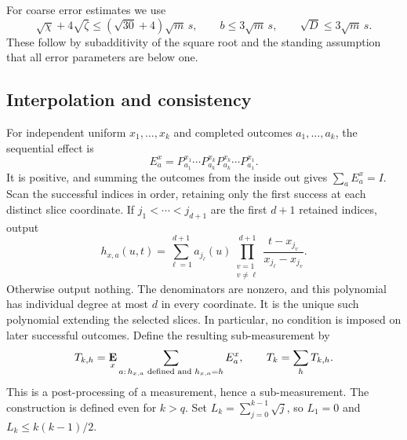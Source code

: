 \documentclass[11pt]{article}
\theoremstyle{definition}
\newcommand{\E}{\mathop{\bf E\/}}
\begin{document}
For coarse error estimates we use
\begin{equation}\label{eq:pasting-root-budgets}
 \sqrt\chi+4\sqrt\zeta\leq(\sqrt{30}+4)\sqrt m\,s,
 \qquad b\leq3\sqrt m\,s,
 \qquad\sqrt D\leq3\sqrt m\,s.
\end{equation}
These follow by subadditivity of the square root and the standing
assumption that all error parameters are below one.

\subsection{Interpolation and consistency}
\label{sec:ld-sandwiching}

For independent uniform $x_1,\ldots,x_k$ and completed outcomes
$a_1,\ldots,a_k$, the sequential effect is
\begin{equation}\label{eq:sequential-povm}
 E_a^x=P_{a_1}^{x_1}\cdots P_{a_k}^{x_k}
             P_{a_k}^{x_k}\cdots P_{a_1}^{x_1}.
\end{equation}
It is positive, and summing the outcomes from the inside out gives
$\sum_aE_a^x=I$.  Scan the successful indices in order, retaining
only the first success at each distinct slice coordinate.  If
$j_1<\cdots<j_{d+1}$ are the first $d+1$ retained indices, output
\begin{equation}\label{eq:first-success-interpolation}
 h_{x,a}(u,t)=\sum_{\ell=1}^{d+1}a_{j_\ell}(u)
       \prod_{\substack{v=1\\v\ne\ell}}^{d+1}
       \frac{t-x_{j_v}}{x_{j_\ell}-x_{j_v}}.
\end{equation}
Otherwise output nothing.  The denominators are nonzero, and this
polynomial has individual degree at most $d$ in every coordinate.
It is the unique such polynomial extending the selected slices.
In particular, no condition is imposed on later successful outcomes.
Define the resulting sub-measurement by
\begin{equation}\label{eq:first-success-pasted-measurement}
 T_{k,h}=\E_x\sum_{a:\,h_{x,a}\text{ defined and }h_{x,a}=h}E_a^x,
 \qquad T_k=\sum_hT_{k,h}.
\end{equation}
This is a post-processing of a measurement, hence a sub-measurement.
The construction is defined even for $k>q$.
Set $L_k=\sum_{j=0}^{k-1}\sqrt j$, so $L_1=0$ and
$L_k\leq k(k-1)/2$.
\end{document}
